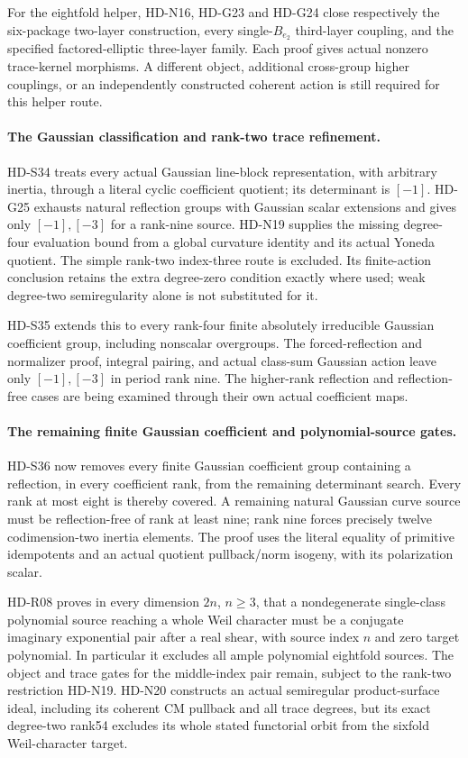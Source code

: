 For the eightfold helper, HD-N16, HD-G23 and HD-G24 close respectively
the six-package two-layer construction, every single-$B_{e_2}$ third-layer
coupling, and the specified factored-elliptic three-layer family. Each
proof gives actual nonzero trace-kernel morphisms. A different object,
additional cross-group higher couplings, or an independently constructed
coherent action is still required for this helper route.

\paragraph{The Gaussian classification and rank-two trace refinement.}
HD-S34 treats every actual Gaussian line-block representation, with
arbitrary inertia, through a literal cyclic coefficient quotient;
its determinant is $[-1]$. HD-G25 exhausts natural reflection groups
with Gaussian scalar extensions and gives only $[-1],[-3]$ for a
rank-nine source. HD-N19 supplies the missing degree-four evaluation
bound from a global curvature identity and its actual Yoneda quotient.
The simple rank-two index-three route is excluded. Its finite-action
conclusion retains the extra degree-zero condition exactly where used;
weak degree-two semiregularity alone is not substituted for it.

HD-S35 extends this to every rank-four finite absolutely irreducible
Gaussian coefficient group, including nonscalar overgroups. The
forced-reflection and normalizer proof, integral pairing, and actual
class-sum Gaussian action leave only $[-1],[-3]$ in period rank nine.
The higher-rank reflection and reflection-free cases are being examined
through their own actual coefficient maps.

\paragraph{The remaining finite Gaussian coefficient and polynomial-source gates.}
HD-S36 now removes every finite Gaussian coefficient group containing
a reflection, in every coefficient rank, from the remaining determinant
search. Every rank at most eight is thereby covered. A remaining natural
Gaussian curve source must be reflection-free of rank at least nine;
rank nine forces precisely twelve codimension-two inertia elements.
The proof uses the literal equality of primitive idempotents and an
actual quotient pullback/norm isogeny, with its polarization scalar.

HD-R08 proves in every dimension $2n$, $n\ge3$, that a nondegenerate
single-class polynomial source reaching a whole Weil character must
be a conjugate imaginary exponential pair after a real shear, with
source index $n$ and zero target polynomial. In particular it excludes
all ample polynomial eightfold sources. The object and trace gates
for the middle-index pair remain, subject to the rank-two restriction
HD-N19. HD-N20 constructs an actual semiregular product-surface ideal,
including its coherent CM pullback and all trace degrees, but its exact
degree-two rank54 excludes its whole stated functorial orbit from the
sixfold Weil-character target.

